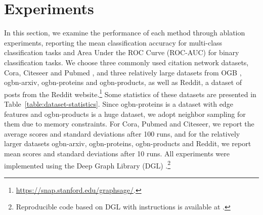 \documentclass[sigconf,screen,nonacm]{acmart} \usepackage{booktabs}
\begin{document}
	
	












	\section{Experiments}
In this section, we examine the performance of each method through ablation experiments, reporting the mean classification accuracy for multi-class classification tasks and Area Under the ROC Curve (ROC-AUC) for binary classification tasks. We choose three commonly used citation network datasets, Cora, Citeseer and Pubmed \citep{DBLP:journals/aim/SenNBGGE08}, and three relatively large datasets from OGB \citep{hu2020open}, ogbn-arxiv, ogbn-proteins and ogbn-products, as well as Reddit, a dataset of posts from the Reddit website.\footnote{\url{https://snap.stanford.edu/graphsage/}.}
	Some statistics of these datasets are presented in Table~\ref{table:dataset-statistics}.
	Since ogbn-proteins is a dataset with edge features and ogbn-products is a huge dataset, we adopt neighbor sampling for them due to memory constraints.
	For Cora, Pubmed and Citeseer, we report the average scores and standard deviations after 100 runs, and for the relatively larger datasets ogbn-arxiv, ogbn-proteins, ogbn-products and Reddit, we report mean scores and standard deviations after 10 runs.
All experiments were implemented using the Deep Graph Library (DGL) \citep{wang2019deep}.\footnote{Reproducible code based on DGL with instructions is available at .} 
\end{document}
